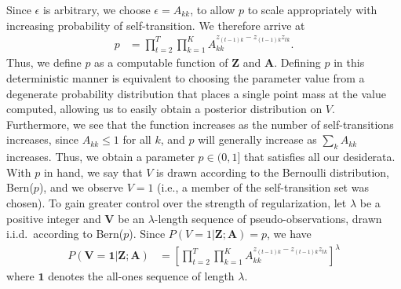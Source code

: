 \documentclass[letterpaper]{article}
\begin{document}
Since $\epsilon$ is arbitrary, we choose $\epsilon = A_{kk}$, to allow $p$ to scale appropriately with increasing probability of self-transition. We therefore arrive at
\begin{align*}
    p &= \prod^{T}_{t=2}\prod^{K}_{k=1}A_{kk}^{z_{(t-1)k} - z_{(t-1)k}z_{tk}}.
\end{align*}
Thus, we define $p$ as a computable function of $\mathbf{Z}$ and $\mathbf{A}$.
Defining $p$ in this deterministic manner is equivalent to choosing the
parameter value from a degenerate probability distribution that places a single
point mass at the value computed, allowing us to easily obtain a posterior
distribution on $V$. Furthermore, we see that the function increases as the
number of self-transitions increases, since $A_{kk} \leq 1$ for all $k$, and $p$
will generally increase as $\sum_k A_{kk}$ increases. Thus, we obtain a
parameter $p \in (0,1]$ that satisfies all our desiderata.
With $p$ in hand, we say that $V$ is drawn according to the Bernoulli
distribution, Bern($p$), and we observe $V = 1$ (i.e., a member of the
self-transition set was chosen). 
To gain greater control over the strength of regularization, let $\lambda$ be a
positive integer and $\mathbf{V}$ be an $\lambda$-length sequence of
pseudo-observations, drawn i.i.d.\ according to Bern($p$). Since $P(V =
1|\mathbf{Z};\mathbf{A}) = p$, we have
\begin{align*}
    P(\mathbf{V} = \mathbf{1}|\mathbf{Z}; \mathbf{A}) &= \left[\prod^{T}_{t=2}\prod^{K}_{k=1}A_{kk}^{z_{(t-1)k} - z_{(t-1)k}z_{tk}}\right]^\lambda
\end{align*}
where $\mathbf{1}$ denotes the all-ones sequence of length $\lambda$.
\end{document}
